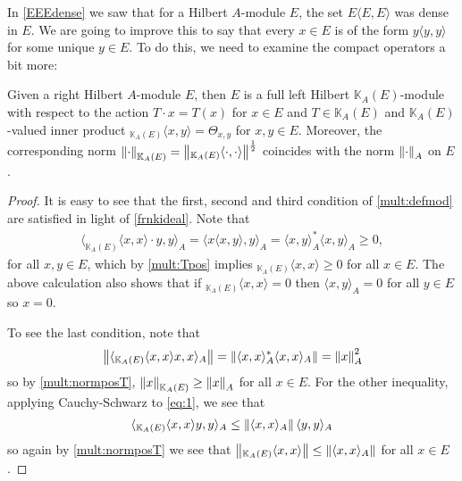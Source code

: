 In \ref{EEEdense} we saw that for a Hilbert $A$-module $E$, the set $E \langle E, E \rangle$ was dense in $E$. We are going to improve this to say that every $x \in E$ is of the form $y \langle y,y \rangle$ for some unique $y \in E$. To do this, we need to examine the compact operators a bit more: 

\begin{proposition}
	Given a right Hilbert $A$-module $E$, then $E$ is a full left Hilbert $\mathbb{K}_A(E)$-module with respect to the action $T\cdot x = T(x)$ for $x \in E$ and $T \in \mathbb{K}_A(E)$ and $\mathbb{K}_A(E)$-valued inner product $_{\mathbb{K}_A(E)} \langle x,y \rangle = \Theta_{x,y}$ for $x, y \in E$. Moreover, the corresponding norm $\left\lVert \cdot \right\rVert_{\mathbb{K}_A(E)} = \left\lVert _{\mathbb{K}_A(E)} \langle \cdot, \cdot \rangle \right\rVert^{\frac12}$ coincides with the norm $\left\lVert \cdot \right\rVert_{A}$ on $E$.
	\label{mult:leftcompmod}
\end{proposition}
\begin{proof}
	It is easy to see that the first, second and third condition of \ref{mult:defmod} are satisfied in light of \ref{frnkideal}. Note that
	\begin{align}
		\langle _{\mathbb{K}_A(E)}\langle x,x \rangle \cdot y , y \rangle_A = \langle x \langle x,y \rangle , y \rangle_A = \langle x,y \rangle_A^* \langle x,y \rangle_A \geq 0,
		\label{eq:1}
	\end{align}
	for all $x,y \in E$, which by \ref{mult:Tpos} implies $_{\mathbb{K}_A(E)} \langle x,x \rangle \geq 0$ for all $x \in E$. The above calculation also shows that if $_{\mathbb{K}_A(E) } \langle x, x \rangle = 0$ then $\langle x,y \rangle_A = 0$ for all $y \in E$ so $x = 0$.

	To see the last condition, note that 
	\begin{align*}
		\left\lVert \langle _{\mathbb{K}_A(E)} \langle x,x \rangle x , x \rangle_A \right\rVert = \left\lVert \langle x , x \rangle_A^* \langle x, x \rangle_A\right\rVert = \left\lVert x \right\rVert_A^2
	\end{align*}
	so by \ref{mult:normposT}, $\left\lVert x \right\rVert_{\mathbb{K}_A(E)} \geq \left\lVert x \right\rVert_{A}$ for all $x \in E$. For the other inequality, applying Cauchy-Schwarz to \ref{eq:1}, we see that 
	\begin{align*}
		\langle _{\mathbb{K}_A(E)} \langle x,x \rangle y , y \rangle_A \leq \left\lVert \langle x,x \rangle_A \right\rVert \langle y,y \rangle_A	
	\end{align*}
	so again by \ref{mult:normposT} we see that $\left\lVert _{\mathbb{K}_A(E)} \langle x, x \rangle\right\rVert \leq \left\lVert \langle x,x\rangle_A \right\rVert$ for all $x \in E$.
\end{proof}
